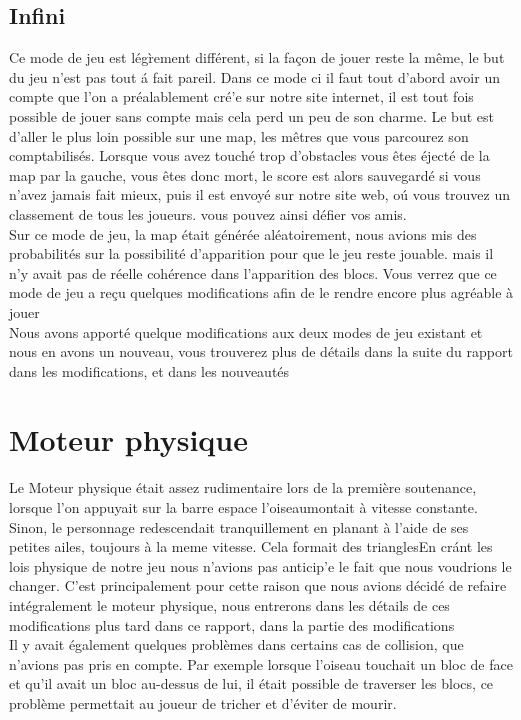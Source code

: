 \documentclass [11pt]{report}
\begin{document}
			\subsection{Infini}
			Ce mode de jeu est l\'eg\`rement diff\'erent, si la façon de jouer reste la m\^eme, le but du jeu n'est pas tout \'a fait pareil. Dans ce mode ci il faut tout d'abord avoir un compte que l'on a pr\'ealablement cr\'e'e sur notre site internet, il est tout fois possible de jouer sans compte mais cela perd un peu de son charme. Le but est d'aller le plus loin possible sur une map, les m\^etres que vous parcourez son comptabilis\'es. Lorsque vous avez touch\'e trop d'obstacles vous \^etes \'eject\'e de la map par la gauche, vous \^etes donc mort, le score est alors sauvegard\'e si vous n'avez jamais fait mieux, puis il est envoy\'e sur notre site web, o\'u vous trouvez un classement de tous les joueurs. vous pouvez ainsi d\'efier vos amis. \\
			\indent Sur ce mode de jeu, la map \'etait g\'en\'er\'ee al\'eatoirement, nous avions mis des probabilit\'es sur la possibilit\'e d'apparition pour que le jeu reste jouable. mais il n'y avait pas de r\'eelle coh\'erence dans l'apparition des blocs. Vous verrez que ce mode de jeu a reçu quelques modifications afin de le rendre encore plus agr\'eable \`a jouer\\
			\indent Nous avons apport\'e quelque modifications aux deux modes de jeu existant et nous en avons un nouveau, vous trouverez plus de d\'etails dans la suite du rapport dans les modifications, et dans les nouveaut\'es
	\section{Moteur physique}
		\indent Le Moteur physique \'etait assez rudimentaire lors de la premi\`ere soutenance, lorsque l'on appuyait sur la barre espace l'oiseaumontait \`a vitesse constante. Sinon, le personnage redescendait tranquillement en planant \`a l'aide de ses petites ailes, toujours \`a la meme vitesse. Cela formait des trianglesEn cr\'ant les lois physique de notre jeu nous n'avions pas anticip'e le fait que nous voudrions le changer. C'est principalement pour cette raison que nous avions d\'ecid\'e de refaire int\'egralement le moteur physique, nous entrerons dans les d\'etails de ces modifications plus tard dans ce rapport, dans la partie des modifications\\
		\indent Il y avait \'egalement quelques probl\`emes dans certains cas de collision, que n'avions pas pris en compte. Par exemple lorsque l'oiseau touchait un bloc de face et qu'il avait un bloc au-dessus de lui, il \'etait possible de traverser les blocs, ce probl\`eme permettait au joueur de tricher et d'\'eviter de mourir.\\
\end{document}

